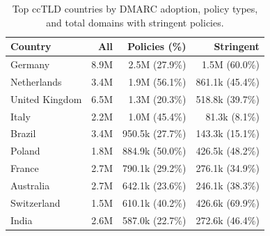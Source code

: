 \begin{table}[tb]
\footnotesize
\centering
\caption{Top ccTLD countries by DMARC adoption, policy types, and total domains with stringent policies.}
\begin{tabular}{lrrr}
\toprule
\textbf{Country} & \textbf{All} & \textbf{Policies (\%)} & \textbf{Stringent} \\
\midrule
Germany & 8.9M & 2.5M (27.9\%) & 1.5M (60.0\%) \\
Netherlands & 3.4M & 1.9M (56.1\%) & 861.1k (45.4\%) \\
United Kingdom & 6.5M & 1.3M (20.3\%) & 518.8k (39.7\%) \\
Italy & 2.2M & 1.0M (45.4\%) & 81.3k (8.1\%) \\
Brazil & 3.4M & 950.5k (27.7\%) & 143.3k (15.1\%) \\
Poland & 1.8M & 884.9k (50.0\%) & 426.5k (48.2\%) \\
France & 2.7M & 790.1k (29.2\%) & 276.1k (34.9\%) \\
Australia & 2.7M & 642.1k (23.6\%) & 246.1k (38.3\%) \\
Switzerland & 1.5M & 610.1k (40.2\%) & 426.6k (69.9\%) \\
India & 2.6M & 587.0k (22.7\%) & 272.6k (46.4\%) \\
\bottomrule
\end{tabular}
\label{tab:dmarc_country_policies}
\vspace{-15px}
\end{table}